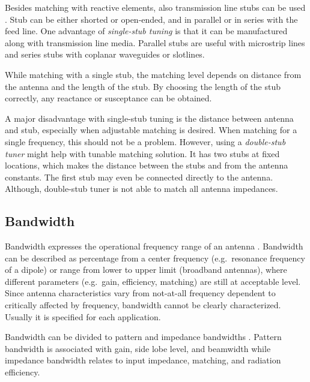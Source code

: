 Besides matching with reactive elements, also transmission line stubs can be used \cite{pozar}. Stub can be either shorted or open-ended, and in parallel or in series with the feed line. One advantage of \textit{single-stub tuning} is that it can be manufactured along with transmission line media. Parallel stubs are useful with microstrip lines and series stubs with coplanar waveguides or slotlines.

While matching with a single stub, the matching level depends on distance from the antenna and the length of the stub. By choosing the length of the stub correctly, any reactance or susceptance can be obtained. %

A major disadvantage with single-stub tuning is the distance between antenna and stub, especially when adjustable matching is desired. When matching for a single frequency, this should not be a problem. However, using a \textit{double-stub tuner} might help with tunable matching solution. It has two stubs at fixed locations, which makes the distance between the stubs and from the antenna constants. The first stub may even be connected directly to the antenna. Although, double-stub tuner is not able to match all antenna impedances. %


\subsection{Bandwidth}
\label{sec:bandwidth}
Bandwidth expresses the operational frequency range of an antenna \cite{balanis}. Bandwidth can be described as percentage from a center frequency (e.g.\ resonance frequency of a dipole) or range from lower to upper limit (broadband antennas), where different parameters (e.g.\ gain, efficiency, matching) are still at acceptable level. Since antenna characteristics vary from not-at-all frequency dependent to critically affected by frequency, bandwidth cannot be clearly characterized. Usually it is specified for each application.

Bandwidth can be divided to pattern and impedance bandwidths \cite{balanis}. Pattern bandwidth is associated with gain, side lobe level, and beamwidth while impedance bandwidth relates to input impedance, matching, and radiation efficiency.

